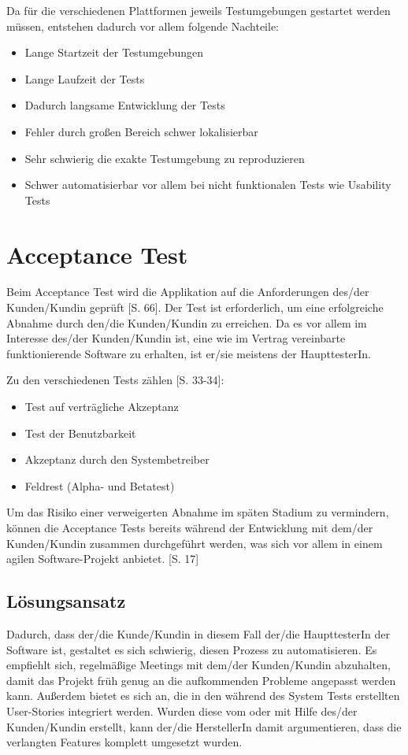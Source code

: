 \documentclass[a4paper,bibtotoc,oneside]{scrbook}
\begin{document}
Da für die verschiedenen Plattformen jeweils Testumgebungen gestartet werden müssen, entstehen dadurch vor allem folgende Nachteile:

\begin{itemize}
  \item Lange Startzeit der Testumgebungen
  \item Lange Laufzeit der Tests
  \item Dadurch langsame Entwicklung der Tests
  \item Fehler durch großen Bereich schwer lokalisierbar
  \item Sehr schwierig die exakte Testumgebung zu reproduzieren
  \item Schwer automatisierbar vor allem bei nicht funktionalen Tests wie Usability Tests
\end{itemize}


\chapter{Acceptance Test}
Beim Acceptance Test wird die Applikation auf die Anforderungen des/der Kunden/Kundin geprüft \cite{test_large_systems}[S. 66]. Der Test ist erforderlich, um eine erfolgreiche Abnahme durch den/die Kunden/Kundin zu erreichen. Da es vor allem im Interesse des/der Kunden/Kundin ist, eine wie im Vertrag vereinbarte funktionierende Software zu erhalten, ist er/sie meistens der HaupttesterIn.

Zu den verschiedenen Tests zählen \cite{betrieb}[S. 33-34]:

\begin{itemize}
   \item \glqq Test auf verträgliche Akzeptanz\grqq
   \item \glqq Test der Benutzbarkeit\grqq
   \item \glqq Akzeptanz durch den Systembetreiber\grqq
   \item \glqq Feldrest (Alpha- und Betatest)\grqq
 \end{itemize} 

Um das Risiko einer verweigerten Abnahme im späten Stadium zu vermindern, können die Acceptance Tests bereits während der Entwicklung mit dem/der Kunden/Kundin zusammen durchgeführt werden, was sich vor allem in einem agilen Software-Projekt anbietet. \cite{eval_regression}[S. 17]

\section{Lösungsansatz}
Dadurch, dass der/die Kunde/Kundin in diesem Fall der/die HaupttesterIn der Software ist, gestaltet es sich schwierig, diesen Prozess zu automatisieren. Es empfiehlt sich, regelmäßige Meetings mit dem/der Kunden/Kundin abzuhalten, damit das Projekt früh genug an die aufkommenden Probleme angepasst werden kann. Außerdem bietet es sich an, die in den während des System Tests erstellten User-Stories integriert werden. Wurden diese vom oder mit Hilfe des/der Kunden/Kundin erstellt, kann der/die HerstellerIn damit argumentieren, dass die verlangten Features komplett umgesetzt wurden.
\end{document}

